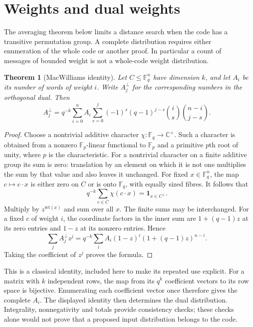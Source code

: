 \documentclass[11pt,a4paper]{article}
\newtheorem{theorem}{Theorem}[section]
\numberwithin{equation}{section}
\begin{document}
\section{Weights and dual weights}

The averaging theorem below limits a distance search when the code has
a transitive permutation group. A complete distribution requires either
enumeration of the whole code or another proof. In particular a count of
messages of bounded weight is not a whole-code weight distribution.

\begin{theorem}[MacWilliams identity]\label{ULCD.MacWilliams}
Let $C\leq\mathbb F_q^n$ have dimension $k$, and let $A_i$ be its number
of words of weight $i$. Write $A_j^\perp$ for the corresponding numbers
in the orthogonal dual. Then
\[
 A_j^\perp=q^{-k}\sum_{i=0}^n A_i
 \sum_{s=0}^j(-1)^s(q-1)^{j-s}
                 \binom is\binom{n-i}{j-s}.
\]
\end{theorem}
\begin{proof}
Choose a nontrivial additive character
$\chi:\mathbb F_q\to\mathbb C^\times$. Such a character is obtained
from a nonzero $\mathbb F_p$-linear functional to $\mathbb F_p$ and a
primitive $p$th root of unity, where $p$ is the characteristic.
For a nontrivial character on a finite additive group its sum is zero:
translation by an element on which it is not one multiplies the sum by
that value and also leaves it unchanged.
For fixed $x\in\mathbb F_q^n$, the map $c\mapsto c\cdot x$ is either
zero on $C$ or is onto $\mathbb F_q$, with equally sized fibres.
It follows that
\[
 q^{-k}\sum_{c\in C}\chi(c\cdot x)=\mathbf1_{x\in C^\perp}.
\]
Multiply by $z^{\mathrm{wt}(x)}$ and sum over all $x$. The finite sums
may be interchanged. For a fixed $c$ of weight $i$, the coordinate factors
in the inner sum are $1+(q-1)z$ at its zero entries and $1-z$ at its
nonzero entries. Hence
\[
 \sum_j A_j^\perp z^j
 =q^{-k}\sum_i A_i(1-z)^i(1+(q-1)z)^{n-i}.
\]
Taking the coefficient of $z^j$ proves the formula.
\end{proof}

This is a classical identity, included here to make its repeated use
explicit. For a matrix with $k$ independent rows, the map from its
$q^k$ coefficient vectors to its row space is bijective. Enumerating
each coefficient vector once therefore gives the complete $A_i$.
The displayed identity then determines the dual distribution. Integrality,
nonnegativity and totals provide consistency checks; these checks alone
would not prove that a proposed input distribution belongs to the code.
\end{document}
